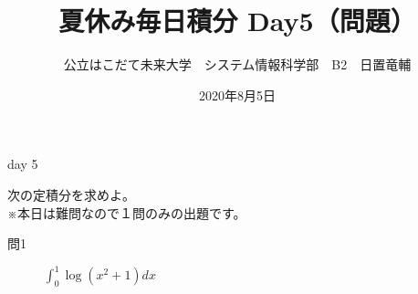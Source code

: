 \documentclass[dvipdfmx,uplatex]{jsarticle}
\title{夏休み毎日積分 Day5（問題）}
\author{公立はこだて未来大学　システム情報科学部　B2　日置竜輔}
\date{2020年8月5日}
\begin{document}
\maketitle

\begin{itembox}[c]{day 5}
    \begin{center}
        次の定積分を求めよ。\\
        ※本日は難問なので１問のみの出題です。
    \end{center}
\end{itembox}
\begin{description}
    \item [問1] $ \displaystyle \int_0^1 \log(x^2 + 1) dx $
\end{description}
\end{document}
